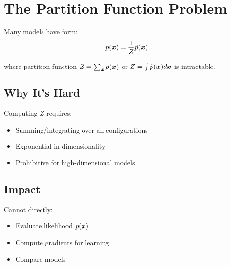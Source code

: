 
\section{The Partition Function Problem }
\label{sec:partition-problem}

Many models have form:
\begin{equation}
p(\boldsymbol{x}) = \frac{1}{Z} \tilde{p}(\boldsymbol{x})
\end{equation}

where partition function $Z = \sum_{\boldsymbol{x}} \tilde{p}(\boldsymbol{x})$ or $Z = \int \tilde{p}(\boldsymbol{x}) d\boldsymbol{x}$ is intractable.

\subsection{Why It's Hard}

Computing $Z$ requires:
\begin{itemize}
    \item Summing/integrating over all configurations
    \item Exponential in dimensionality
    \item Prohibitive for high-dimensional models
\end{itemize}

\subsection{Impact}

Cannot directly:
\begin{itemize}
    \item Evaluate likelihood $p(\boldsymbol{x})$
    \item Compute gradients for learning
    \item Compare models
\end{itemize}





